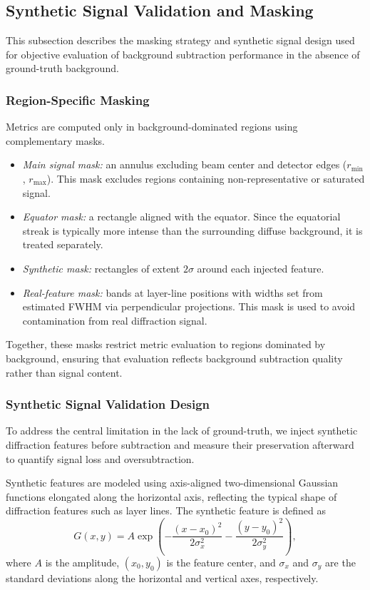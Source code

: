 \documentclass[11pt,onecolumn]{IEEEtran}
\begin{document}
\subsection{Synthetic Signal Validation and Masking}

This subsection describes the masking strategy and synthetic signal design used for objective evaluation of background subtraction performance in the absence of ground-truth background.

\subsubsection{Region-Specific Masking}

Metrics are computed only in background-dominated regions using complementary masks.
\begin{itemize}
\item \textit{Main signal mask:} an annulus excluding beam center and detector edges ($r_{\mathrm{min}}$, $r_{\mathrm{max}}$). This mask excludes regions containing non-representative or saturated signal.
\item \textit{Equator mask:} a rectangle aligned with the equator. Since the equatorial streak is typically more intense than the surrounding diffuse background, it is treated separately.
\item \textit{Synthetic mask:} rectangles of extent $2\sigma$ around each injected feature.
\item \textit{Real-feature mask:} bands at layer-line positions with widths set from estimated FWHM via perpendicular projections. This mask is used to avoid contamination from real diffraction signal.
\end{itemize}

Together, these masks restrict metric evaluation to regions dominated by background, ensuring that evaluation reflects background subtraction quality rather than signal content.


\subsubsection{Synthetic Signal Validation Design}

To address the central limitation in the lack of ground-truth, we inject synthetic diffraction features before subtraction and measure their preservation afterward to quantify signal loss and oversubtraction.


Synthetic features are modeled using axis-aligned two-dimensional Gaussian functions elongated along the horizontal axis, reflecting the typical shape of diffraction features such as layer lines. The synthetic feature is defined as
\begin{equation}
G(x, y) = A \exp\!\left(
-\frac{(x-x_0)^2}{2\sigma_x^2}
-\frac{(y-y_0)^2}{2\sigma_y^2}
\right),
\end{equation}
where $A$ is the amplitude, $(x_0, y_0)$ is the feature center, and $\sigma_x$ and $\sigma_y$ are the standard deviations along the horizontal and vertical axes, respectively.
\end{document}
